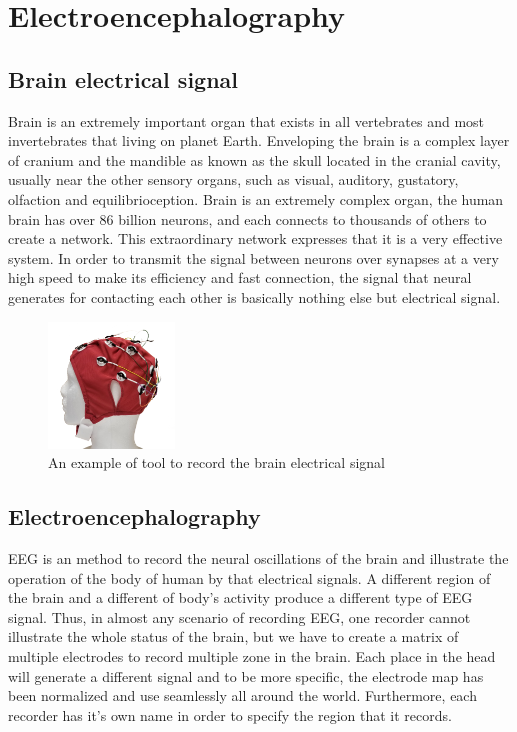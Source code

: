 
\section{Electroencephalography}
    \subsection{Brain electrical signal}
    Brain is an extremely important organ that exists in all vertebrates and most invertebrates that living on planet Earth. Enveloping the brain is a complex layer of cranium and the mandible as known as the skull located in the cranial cavity, usually near the other sensory organs, such as visual, auditory, gustatory, olfaction and equilibrioception. Brain is an extremely complex organ, the human brain has over 86 billion neurons, and each connects to thousands of others to create a network. This extraordinary network expresses that it is a very effective system. In order to transmit the signal between neurons over synapses at a very high speed to make its efficiency and fast connection, the signal that neural generates for contacting each other is basically nothing else but electrical signal.
    
        \begin{figure}[h]
        \centering
        \includegraphics[width=0.3\textwidth]{images/19E.png}
        \caption{An example of tool to record the brain electrical signal}
    \end{figure} 
    
    \subsection{Electroencephalography}
    
     EEG is an method to record the neural oscillations of the brain and illustrate the operation of the body of human by that electrical signals. A different region of the brain and a different of body's activity produce a different type of EEG signal. Thus, in almost any scenario of recording EEG, one recorder cannot illustrate the whole status of the brain, but we have to create a matrix of multiple electrodes to record multiple zone in the brain. Each place in the head will generate a different signal and to be more specific, the electrode map has been normalized and use seamlessly all around the world. Furthermore, each recorder has it's own name in order to specify the region that it records. 
    

